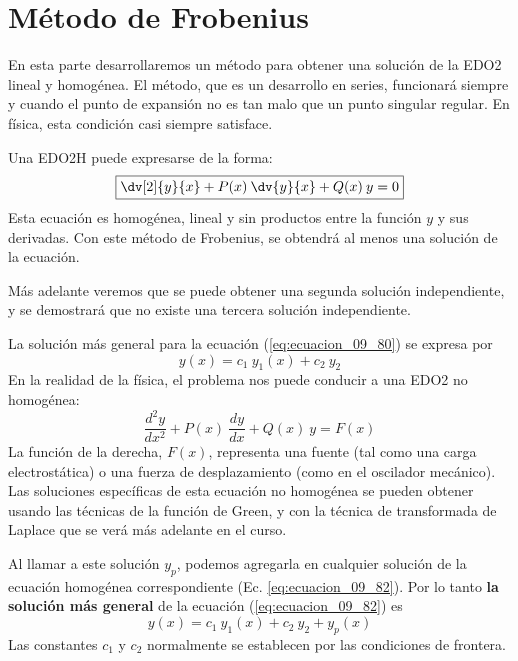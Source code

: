 \section{Método de Frobenius}
En esta parte desarrollaremos un método para obtener una solución de la EDO2 lineal y homogénea. El método, que es un desarrollo en series, funcionará siempre y cuando el punto de expansión no es tan malo que un punto singular regular. En física, esta condición casi siempre satisface.
\par
Una EDO2H puede expresarse de la forma:
\begin{equation}
\boxed{\dv[2]{y}{x} + P(x) \: \dv{y}{x} + Q(x) \: y = 0}
\label{eq:ecuacion_09_80}
\end{equation}
Esta ecuación es homogénea, lineal y sin productos entre la función $y$ y sus derivadas. Con este método de Frobenius, se obtendrá al menos una solución de la ecuación.
\par
Más adelante veremos que se puede obtener una segunda solución independiente, y se demostrará que no existe una tercera solución independiente.
\par
La solución más general para la ecuación (\ref{eq:ecuacion_09_80}) se expresa por
\begin{equation}
\boxed{y(x) = c_{1} \: y_{1}(x) + c_{2} \: y_{2}}
\label{eq:ecuacion_09_81}
\end{equation}
En la realidad de la física, el problema nos puede conducir a una EDO2 no homogénea:
\begin{equation}
\boxed{\dfrac{d^{2} y}{d x^{2}} + P(x) \: \dfrac{dy}{dx} + Q(x) \: y = F(x)}
\label{eq:ecuacion_09_82}
\end{equation}
La función de la derecha, $F(x)$, representa una fuente (tal como una carga electrostática) o una fuerza de desplazamiento (como en el oscilador mecánico). Las soluciones específicas de esta ecuación no homogénea se pueden obtener usando las técnicas de la función de Green, y con la técnica de transformada de Laplace que se verá más adelante en el curso.
\par
Al llamar a este solución $y_{p}$, podemos agregarla en cualquier solución de la ecuación homogénea correspondiente (Ec. \ref{eq:ecuacion_09_82}). Por lo tanto \textbf{la solución más general} de la ecuación (\ref{eq:ecuacion_09_82}) es
\begin{equation}
\boxed{y(x) = c_{1} \: y_{1}(x) + c_{2} \: y_{2} + y_{p} (x) }
\label{eq:ecuacion_09_83}
\end{equation}
Las constantes $c_{1}$ y $c_{2}$ normalmente se establecen por las condiciones de frontera.
